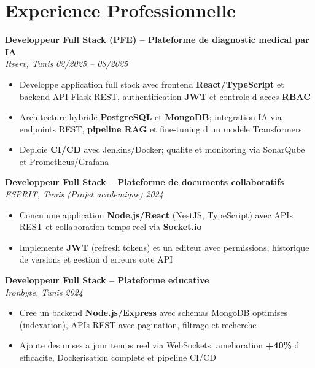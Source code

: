 \documentclass[10pt,a4paper]{article}
\begin{document}
\vspace{6pt}

\section*{Experience Professionnelle}
{\small

\textbf{Developpeur Full Stack (PFE) -- Plateforme de diagnostic medical par IA}\\[1pt]
\textit{Itserv, Tunis} \hfill \textit{02/2025 -- 08/2025}
\begin{itemize}
  \item Developpe application full stack avec frontend \textbf{React/TypeScript} et backend API Flask REST, authentification \textbf{JWT} et controle d acces \textbf{RBAC}
  \item Architecture hybride \textbf{PostgreSQL} et \textbf{MongoDB}; integration IA via endpoints REST, \textbf{pipeline RAG} et fine-tuning d un modele Transformers
  \item Deploie \textbf{CI/CD} avec Jenkins/Docker; qualite et monitoring via SonarQube et Prometheus/Grafana
\end{itemize}

\vspace{3pt}
\textbf{Developpeur Full Stack -- Plateforme de documents collaboratifs}\\[1pt]
\textit{ESPRIT, Tunis (Projet academique)} \hfill \textit{2024}
\begin{itemize}
  \item Concu une application \textbf{Node.js/React} (NestJS, TypeScript) avec APIs REST et collaboration temps reel via \textbf{Socket.io}
  \item Implemente \textbf{JWT} (refresh tokens) et un editeur avec permissions, historique de versions et gestion d erreurs cote API
\end{itemize}

\vspace{3pt}
\textbf{Developpeur Full Stack -- Plateforme educative}\\[1pt]
\textit{Ironbyte, Tunis} \hfill \textit{2024}
\begin{itemize}
  \item Cree un backend \textbf{Node.js/Express} avec schemas MongoDB optimises (indexation), APIs REST avec pagination, filtrage et recherche
  \item Ajoute des mises a jour temps reel via WebSockets, amelioration \textbf{+40\%} d efficacite, Dockerisation complete et pipeline CI/CD
\end{itemize}

}
\end{document}
